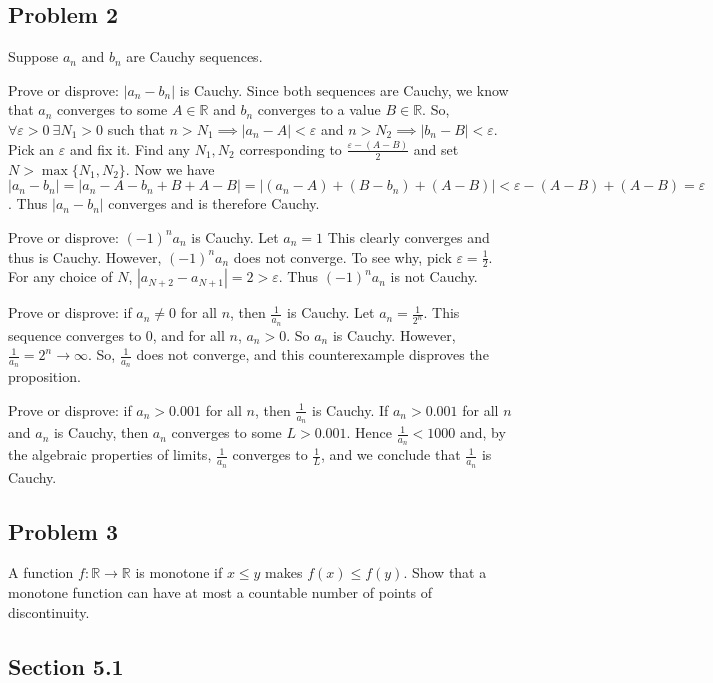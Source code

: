 \documentclass[11pt]{article}
\newcommand{\R}{\mathbb{R}}
\begin{document}
\subsection*{Problem 2}

Suppose $a_n$ and $b_n$ are Cauchy sequences.

Prove or disprove: $|a_n-b_n|$ is Cauchy.
Since both sequences are Cauchy, we know that $a_n$ converges to
some $A\in\R$ and $b_n$ converges to a value $B\in\R$.
So, $\forall\varepsilon>0\ \exists N_1>0$ such that
$n>N_1\implies |a_n-A|<\varepsilon$ and $n>N_2\implies|b_n-B|<\varepsilon$.
Pick an $\varepsilon$ and fix it. Find any $N_1,N_2$ corresponding to
$\frac{\varepsilon-(A-B)}{2}$ and set $N>\max \{N_1,N_2\}$. Now we have
$|a_n-b_n|=|a_n-A-b_n+B+A-B|=|(a_n-A)+(B-b_n)+(A-B)|<\varepsilon-(A-B)+(A-B)
=\varepsilon$. Thus $|a_n-b_n|$ converges and is therefore Cauchy.

Prove or disprove: $(-1)^na_n$ is Cauchy.
Let $a_n=1$ This clearly converges and thus is Cauchy. 
However, $(-1)^na_n$ does not converge. To see why, pick
$\varepsilon=\frac{1}{2}$. For any choice of $N$,
$|a_{N+2}-a_{N+1}|=2>\varepsilon$. Thus $(-1)^na_n$ is not Cauchy.

Prove or disprove: if $a_n\neq0$ for all $n$, then $\frac{1}{a_n}$ is Cauchy.
Let $a_n=\frac{1}{2^n}$. This sequence converges to 0, and for all
$n$, $a_n>0$. So $a_n$ is Cauchy. However, $\frac{1}{a_n}=2^n\to\infty$.
So, $\frac{1}{a_n}$ does not converge, and this counterexample disproves
the proposition.

Prove or disprove: if $a_n>0.001$ for all $n$, then $\frac{1}{a_n}$ is Cauchy.
If $a_n>0.001$ for all $n$ and $a_n$ is Cauchy, then $a_n$ converges
to some $L>0.001$. Hence $\frac{1}{a_n}<1000$ and, by the algebraic properties
of limits, $\frac{1}{a_n}$ converges to $\frac{1}{L}$, and we conclude that
$\frac{1}{a_n}$ is Cauchy.

\subsection*{Problem 3}

A function $f:\R\to\R$ is monotone if $x\leq y$ makes $f(x)\leq f(y)$.
Show that a monotone function can have at most a countable number of
points of discontinuity.



\subsection*{Section 5.1}
\end{document}
